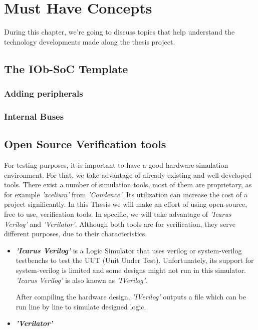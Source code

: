 \chapter{Must Have Concepts}
During this chapter, we're going to discuss topics that help understand the technology developments made along the thesis project.

\section{The IOb-SoC Template}
\label{section:the_iob_soc_template}
\subsection{Adding peripherals}
\subsection{Internal Buses}

\section{Open Source Verification tools}
For testing purposes, it is important to have a good hardware simulation environment. For that, we take advantage of already existing and well-developed tools. There exist a number of simulation tools, most of them are proprietary, as for example \textit{'xcelium'} from \textit{'Candence'}. Its utilization can increase the cost of a project significantly. In this Thesis we will make an effort of using open-source, free to use, verification tools. In specific, we will take advantage of \textit{'Icarus Verilog'} and \textit{'Verilator'}. Although both tools are for verification, they serve different purposes, due to their characteristics.

\begin{itemize}
    \item \textbf{\textit{'Icarus Verilog'}} is a Logic Simulator that uses verilog or system-verilog testbenchs to test the UUT (Unit Under Test). Unfortunately, its support for system-verilog is limited and some designs might not run in this simulator. \textit{'Icarus Verilog'} is also known as \textit{'IVerilog'}.
    
    After compiling the hardware design, \textit{'IVerilog'} outputs a file which can be run line by line to simulate designed logic.
    
    \item \textbf{\textit{'Verilator'}}
\end{itemize}

